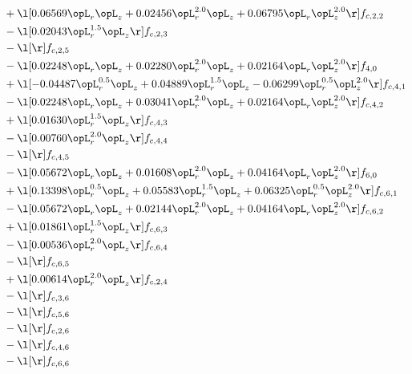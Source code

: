 \begin{alignat}{2}
& + \l[  0.06569 \opL_r \opL_z +  0.02456 \opL_r^{2.0} \opL_z +  0.06795 \opL_r \opL_z^{2.0}  \r] f_{c,2,2} \nonumber \\ 
& - \l[  0.02043 \opL_r^{1.5} \opL_z  \r] f_{c,2,3} \nonumber \\ 
& - \l[  \r] f_{c,2,5} \nonumber \\ 
& - \l[  0.02248 \opL_r \opL_z +  0.02280 \opL_r^{2.0} \opL_z +  0.02164 \opL_r \opL_z^{2.0}  \r] f_{4,0} \nonumber \\ 
& + \l[  -0.04487 \opL_r^{0.5} \opL_z +  0.04889 \opL_r^{1.5} \opL_z   -0.06299 \opL_r^{0.5} \opL_z^{2.0}  \r] f_{c,4,1} \nonumber \\ 
& - \l[  0.02248 \opL_r \opL_z +  0.03041 \opL_r^{2.0} \opL_z +  0.02164 \opL_r \opL_z^{2.0}  \r] f_{c,4,2} \nonumber \\ 
& + \l[  0.01630 \opL_r^{1.5} \opL_z  \r] f_{c,4,3} \nonumber \\ 
& - \l[  0.00760 \opL_r^{2.0} \opL_z  \r] f_{c,4,4} \nonumber \\ 
& - \l[  \r] f_{c,4,5} \nonumber \\ 
& - \l[  0.05672 \opL_r \opL_z +  0.01608 \opL_r^{2.0} \opL_z +  0.04164 \opL_r \opL_z^{2.0}  \r] f_{6,0} \nonumber \\ 
& + \l[  0.13398 \opL_r^{0.5} \opL_z +  0.05583 \opL_r^{1.5} \opL_z +  0.06325 \opL_r^{0.5} \opL_z^{2.0}  \r] f_{c,6,1} \nonumber \\ 
& - \l[  0.05672 \opL_r \opL_z +  0.02144 \opL_r^{2.0} \opL_z +  0.04164 \opL_r \opL_z^{2.0}  \r] f_{c,6,2} \nonumber \\ 
& + \l[  0.01861 \opL_r^{1.5} \opL_z  \r] f_{c,6,3} \nonumber \\ 
& - \l[  0.00536 \opL_r^{2.0} \opL_z  \r] f_{c,6,4} \nonumber \\ 
& - \l[  \r] f_{c,6,5} \nonumber \\ 
& + \l[  0.00614 \opL_r^{2.0} \opL_z  \r] f_{c,2,4} \nonumber \\ 
& - \l[  \r] f_{c,3,6} \nonumber \\ 
& - \l[  \r] f_{c,5,6} \nonumber \\ 
& - \l[  \r] f_{c,2,6} \nonumber \\ 
& - \l[  \r] f_{c,4,6} \nonumber \\ 
& - \l[  \r] f_{c,6,6} \nonumber \\ 
\end{alignat} 


